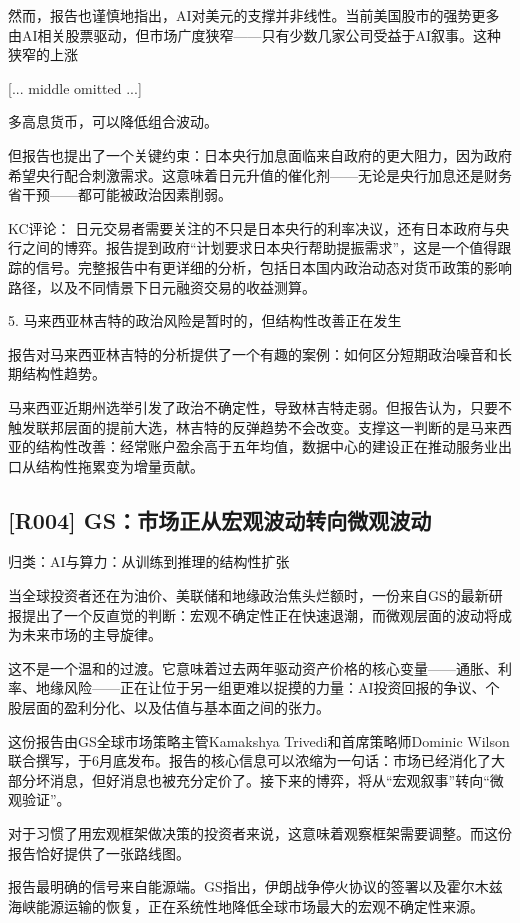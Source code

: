 \documentclass[11pt]{ctexart}
\begin{document}
然而，报告也谨慎地指出，AI对美元的支撑并非线性。当前美国股市的强势更多由AI相关股票驱动，但市场广度狭窄——只有少数几家公司受益于AI叙事。这种狭窄的上涨

[... middle omitted ...]

多高息货币，可以降低组合波动。

但报告也提出了一个关键约束：日本央行加息面临来自政府的更大阻力，因为政府希望央行配合刺激需求。这意味着日元升值的催化剂——无论是央行加息还是财务省干预——都可能被政治因素削弱。

KC评论： 日元交易者需要关注的不只是日本央行的利率决议，还有日本政府与央行之间的博弈。报告提到政府“计划要求日本央行帮助提振需求”，这是一个值得跟踪的信号。完整报告中有更详细的分析，包括日本国内政治动态对货币政策的影响路径，以及不同情景下日元融资交易的收益测算。

5. 马来西亚林吉特的政治风险是暂时的，但结构性改善正在发生

报告对马来西亚林吉特的分析提供了一个有趣的案例：如何区分短期政治噪音和长期结构性趋势。

马来西亚近期州选举引发了政治不确定性，导致林吉特走弱。但报告认为，只要不触发联邦层面的提前大选，林吉特的反弹趋势不会改变。支撑这一判断的是马来西亚的结构性改善：经常账户盈余高于五年均值，数据中心的建设正在推动服务业出口从结构性拖累变为增量贡献。

\subsection{[R004] GS：市场正从宏观波动转向微观波动}
{\small\color{refgray}归类：AI与算力：从训练到推理的结构性扩张}

当全球投资者还在为油价、美联储和地缘政治焦头烂额时，一份来自GS的最新研报提出了一个反直觉的判断：宏观不确定性正在快速退潮，而微观层面的波动将成为未来市场的主导旋律。

这不是一个温和的过渡。它意味着过去两年驱动资产价格的核心变量——通胀、利率、地缘风险——正在让位于另一组更难以捉摸的力量：AI投资回报的争议、个股层面的盈利分化、以及估值与基本面之间的张力。

这份报告由GS全球市场策略主管Kamakshya Trivedi和首席策略师Dominic Wilson联合撰写，于6月底发布。报告的核心信息可以浓缩为一句话：市场已经消化了大部分坏消息，但好消息也被充分定价了。接下来的博弈，将从“宏观叙事”转向“微观验证”。

对于习惯了用宏观框架做决策的投资者来说，这意味着观察框架需要调整。而这份报告恰好提供了一张路线图。

报告最明确的信号来自能源端。GS指出，伊朗战争停火协议的签署以及霍尔木兹海峡能源运输的恢复，正在系统性地降低全球市场最大的宏观不确定性来源。
\end{document}
